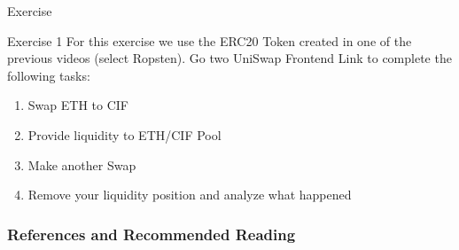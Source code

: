 \documentclass[]{beamer}
\begin{document}
\begin{frame}{Exercise}
	\begin{exercise}{Exercise 1}
	For this exercise we use the ERC20 Token created in one of the previous videos (select Ropsten). Go two UniSwap Frontend Link to complete the following tasks:
	
		\begin{enumerate}
			\item Swap ETH to CIF
			\item Provide liquidity to ETH/CIF Pool
			\item Make another Swap
			\item Remove your liquidity position and analyze what happened
		\end{enumerate}
	\end{exercise}
\end{frame}



\begin{frame}%
\frametitle{References and Recommended Reading}
	
	
\end{frame}
\end{document}
